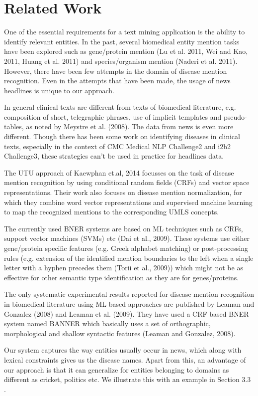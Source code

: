 \documentclass{article}
\begin{document}
\section{Related Work}
One of the essential requirements for a text mining application is the ability to identify relevant entities. In the past, several biomedical entity mention tasks have been explored such as gene/protein mention (Lu et al. 2011, Wei and Kao, 2011, Huang et al. 2011) and species/organism mention (Naderi et al. 2011). However, there have been few attempts in the domain of disease mention recognition. Even in the attempts that have been made, the usage of news headlines is unique to our approach.

In general clinical texts are different from texts of biomedical literature, e.g. composition of short, telegraphic phrases, use of implicit templates and pseudo-tables, as noted by Meystre et al. (2008). The data from news is even more different. Though there has been some work on identifying diseases in clinical texts, especially in the context of CMC Medical NLP Challenge2 and i2b2 Challenge3, these strategies can't be used in
practice for headlines data.

The UTU approach of Kaewphan et.al, 2014 focusses on the task of disease mention
recognition by using conditional random fields (CRFs) and vector space representations.
Their work also focuses on disease mention normalization, for which they combine word
vector representations and supervised machine learning to map the recognized
mentions to the corresponding UMLS concepts.

The currently used BNER systems are based on ML techniques such as CRFs, support
vector machines (SVMs) etc (Dai et al., 2009). These systems use either gene/protein
specific features (e.g. Greek alphabet matching) or post-processing rules (e.g. extension
of the identified mention boundaries to the left when a single letter with a hyphen
precedes them (Torii et al., 2009)) which might not be as effective for other semantic type identification as they are for genes/proteins.

The only systematic experimental results reported for disease mention recognition in
biomedical literature using ML based approaches are published by Leaman and Gonzalez
(2008) and Leaman et al. (2009). They have used a CRF based BNER system named
BANNER which basically uses a set of orthographic, morphological and shallow syntactic features (Leaman and Gonzalez, 2008). 

Our system captures the way entities usually occur in news, which along with lexical constraints gives us the disease names. Apart from this, an advantage of our approach is that it can generalize for entities belonging to domains as different as cricket, politics etc. We illustrate this with an example in Section 3.3 . 
\end{document}
